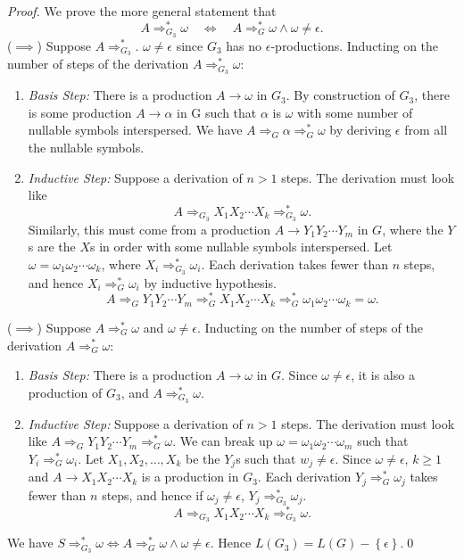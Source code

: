 \begin{proof}
  We prove the more general statement that
  \[A\Rightarrow_{G_3}^{*}\omega\quad\iff\quad A\Rightarrow_{G}^{*}\omega\wedge
  \omega\neq\epsilon.\]
  ($\implies$) Suppose $A\Rightarrow_{G_3}^{*}$. $\omega\neq\epsilon$ since
  $G_3$ has no $\epsilon$-productions. Inducting on the number of steps of the
derivation $A\Rightarrow_{G_3}^{*}\omega$:
  \begin{enumerate}
    \item \textit{Basis Step:} There is a production $A\to\omega$ in $G_3$. By
      construction of $G_3$, there is some production $A\to\alpha$ in G such
      that $\alpha$ is $\omega$ with some number of nullable symbols
      interspersed. We have $A\Rightarrow_G\alpha\Rightarrow _G^{*}\omega$ by
      deriving $\epsilon$ from all the nullable symbols.
    \item \textit{Inductive Step:} Suppose a derivation of $n>1$ steps. The derivation
      must look like
      \[A\Rightarrow_{G_3}X_1X_2\cdots X_k\Rightarrow_{G_3}^{*}\omega.\]
      Similarly, this must come from a production $A\to Y_1Y_2\cdots Y_m$ in
      $G$, where the $Y$s are the $X$s in order with some nullable symbols
      interspersed. Let $\omega=\omega_1\omega_2\cdots\omega_k$, where
      $X_i\Rightarrow ^{*}_{G_3}\omega_i$. Each derivation takes fewer than $n$
      steps, and hence $X_i\Rightarrow _G^{*}\omega_i$ by inductive hypothesis.
      \[A\Rightarrow_G Y_1Y_2\cdots Y_m\Rightarrow _G^{*}X_1X_2\cdots
      X_k\Rightarrow ^{*}_G\omega_1\omega_2\cdots\omega_k=\omega.\] 
  \end{enumerate}
  ($\implies$) Suppose $A\Rightarrow ^{*}_G \omega$ and $\omega\neq\epsilon$. Inducting
  on the number of steps of the derivation $A\Rightarrow _{G}^{*}\omega$:
  \begin{enumerate}
    \item \textit{Basis Step:} There is a production $A\to \omega$ in $G $.
      Since $\omega\neq\epsilon$, it is also a production of $G_3$, and
      $A\Rightarrow _{G_3}^{*}\omega$.
    \item \textit{Inductive Step:} Suppose a derivation of $n>1$ steps. The
      derivation must look like  $A\Rightarrow _G Y_1Y_2\cdots
      Y_m\Rightarrow_G^{*}\omega$. We can break up
      $\omega=\omega_1\omega_2\cdots\omega_m$ such that $Y_i\Rightarrow
      _G^{*}\omega_i$. Let $X_1,X_2,\ldots,X_k$ be the $Y_j$s such that
      $w_j\neq\epsilon$. Since $\omega\neq\epsilon$, $k\ge 1$ and $A\to
      X_1X_2\cdots X_k$ is a production in $G_3$. Each derivation
      $Y_j\Rightarrow_G^{*}\omega_j$ takes fewer than $n$ steps, and hence if
      $\omega_j\neq\epsilon$, $Y_j\Rightarrow ^{*}_{G_3}\omega_j$.
      \[A\Rightarrow _{G_3}X_1X_2\cdots X_k\Rightarrow _{G_3}^{*}\omega.\]
  \end{enumerate}
  We have $S\Rightarrow_{G_3}^{*}\omega\iff A\Rightarrow_G^{*}\omega\wedge\omega\neq\epsilon$. Hence $L(G_3)=L(G)-\left\{ \epsilon \right\} $.\qed
\end{proof}\\

